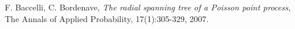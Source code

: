 \documentclass[11pt, english, singlespacing, headsepline, ]{MastersDoctoralThesis}
\theoremstyle{definition}
\begin{document}


\mainmatter %

\pagestyle{thesis} %








%
%
%

\begin{thebibliography}{90}

  F. Baccelli, C. Bordenave,
  \emph{The radial spanning tree of a Poisson point process},
  The Annals of Applied Probability, 17(1):305-329,
  2007.


\end{thebibliography}



\end{document}
